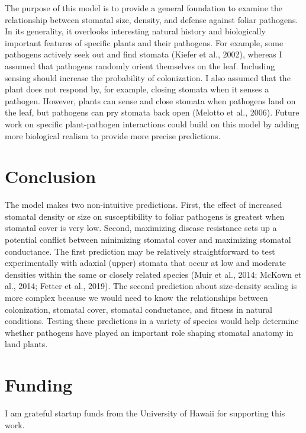 \documentclass[utf8]{frontiersSCNS}
\begin{document}
The purpose of this model is to provide a general foundation to examine
the relationship between stomatal size, density, and defense against
foliar pathogens. In its generality, it overlooks interesting natural
history and biologically important features of specific plants and their
pathogens. For example, some pathogens actively seek out and find
stomata (Kiefer et al., 2002), whereas I assumed that pathogens randomly
orient themselves on the leaf. Including sensing should increase the
probability of colonization. I also assumed that the plant does not
respond by, for example, closing stomata when it senses a pathogen.
However, plants can sense and close stomata when pathogens land on the
leaf, but pathogens can pry stomata back open (Melotto et al., 2006).
Future work on specific plant-pathogen interactions could build on this
model by adding more biological realism to provide more precise
predictions.

\hypertarget{conclusion}{%
\section*{Conclusion}\label{conclusion}}

The model makes two non-intuitive predictions. First, the effect of
increased stomatal density or size on susceptibility to foliar pathogens
is greatest when stomatal cover is very low. Second, maximizing disease
resistance sets up a potential conflict between minimizing stomatal
cover and maximizing stomatal conductance. The first prediction may be
relatively straightforward to test experimentally with adaxial (upper)
stomata that occur at low and moderate densities within the same or
closely related species (Muir et al., 2014; McKown et al., 2014; Fetter
et al., 2019). The second prediction about size-density scaling is more
complex because we would need to know the relationships between
colonization, stomatal cover, stomatal conductance, and fitness in
natural conditions. Testing these predictions in a variety of species
would help determine whether pathogens have played an important role
shaping stomatal anatomy in land plants.

\hypertarget{funding}{%
\section*{Funding}\label{funding}}

I am grateful startup funds from the University of Hawaii for supporting
this work.
\end{document}

